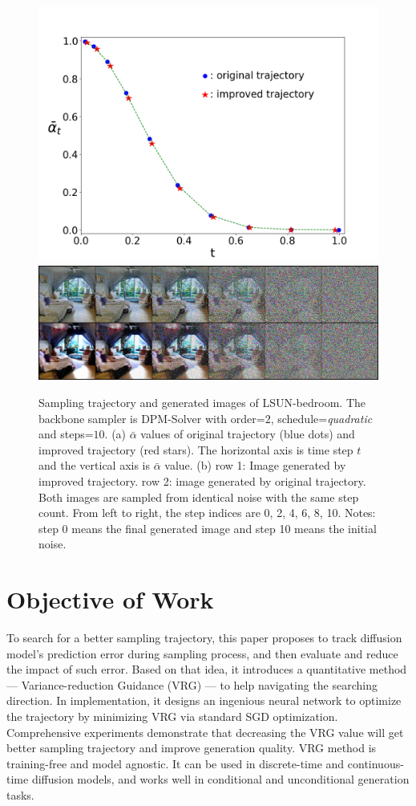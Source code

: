 \begin{figure} 
\centering
\begin{minipage}[h]{\textwidth}
  {\includegraphics[width=.3\textwidth]{figure/abc_o2_s10_tq.png}}
  {\includegraphics[width=.6\textwidth]{figure/bedroom-compare-with-inter-steps.png}}
\caption{Sampling trajectory and generated images of LSUN-bedroom\cite{url_dset_lsun-bedroom}. 
  The backbone sampler is DPM-Solver\cite{lu2022dpm} with order=$2$, schedule=\textit{quadratic} and steps=$10$.
  (a) $\bar{\alpha}$ values of original trajectory (blue dots) and improved trajectory (red stars). The horizontal axis is time step $t$ and the vertical axis is $\bar{\alpha}$ value. 
  (b) row 1: Image generated by improved trajectory. row 2: image generated by original trajectory. Both images are sampled from identical noise with the same step count. From left to right, the step indices are 0, 2, 4, 6, 8, 10. Notes: step 0 means the final generated image and step 10 means the initial noise.} 
\label{fig:compare-ab-img}
\end{minipage}
\end{figure}

\section{Objective of Work}
To search for a better sampling trajectory, this paper proposes to track diffusion model's prediction error during sampling process, and then evaluate and reduce the impact of such error. Based on that idea, it introduces a quantitative method --- Variance-reduction Guidance (VRG) --- to help navigating the searching direction. In implementation, it designs an ingenious neural network to optimize the trajectory by minimizing VRG via standard SGD optimization.
Comprehensive experiments demonstrate that decreasing the VRG value will get better sampling trajectory and improve generation quality. VRG method is training-free and model agnostic. It can be used in discrete-time and continuous-time diffusion models, and works well in conditional and unconditional generation tasks. 


